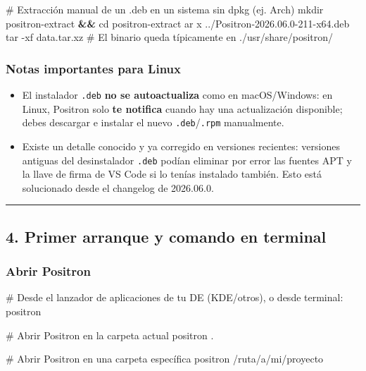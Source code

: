 \documentclass[
  doc,
  floatsintext,
  longtable,
  a4paper,
  nolmodern,
  notxfonts,
  notimes,
  12pt,
  colorlinks=true,linkcolor=blue,citecolor=blue,urlcolor=blue]{apa7}
\newenvironment{Shaded}{\begin{snugshade}}{\end{snugshade}}
\newcommand{\AttributeTok}[1]{\textcolor[rgb]{0.40,0.45,0.13}{#1}}
\newcommand{\BuiltInTok}[1]{\textcolor[rgb]{0.00,0.23,0.31}{#1}}
\newcommand{\CommentTok}[1]{\textcolor[rgb]{0.37,0.37,0.37}{#1}}
\newcommand{\ExtensionTok}[1]{\textcolor[rgb]{0.00,0.23,0.31}{#1}}
\newcommand{\FunctionTok}[1]{\textcolor[rgb]{0.28,0.35,0.67}{#1}}
\newcommand{\KeywordTok}[1]{\textcolor[rgb]{0.00,0.23,0.31}{\textbf{#1}}}
\newcommand{\NormalTok}[1]{\textcolor[rgb]{0.00,0.23,0.31}{#1}}
\providecommand{\tightlist}{%
  \setlength{\itemsep}{0pt}\setlength{\parskip}{0pt}}
\begin{document}
\begin{Shaded}
\begin{Highlighting}[]
\CommentTok{\# Extracción manual de un .deb en un sistema sin dpkg (ej. Arch)}
\FunctionTok{mkdir}\NormalTok{ positron{-}extract }\KeywordTok{\&\&} \BuiltInTok{cd}\NormalTok{ positron{-}extract}
\FunctionTok{ar}\NormalTok{ x ../Positron{-}2026.06.0{-}211{-}x64.deb}
\FunctionTok{tar} \AttributeTok{{-}xf}\NormalTok{ data.tar.xz}
\CommentTok{\# El binario queda típicamente en ./usr/share/positron/}
\end{Highlighting}
\end{Shaded}

\subsubsection{Notas importantes para
Linux}\label{notas-importantes-para-linux}

\begin{itemize}
\tightlist
\item
  El instalador \texttt{.deb} \textbf{no se autoactualiza} como en
  macOS/Windows: en Linux, Positron solo \textbf{te notifica} cuando hay
  una actualización disponible; debes descargar e instalar el nuevo
  \texttt{.deb}/\texttt{.rpm} manualmente.
\item
  Existe un detalle conocido y ya corregido en versiones recientes:
  versiones antiguas del desinstalador \texttt{.deb} podían eliminar por
  error las fuentes APT y la llave de firma de VS Code si lo tenías
  instalado también. Esto está solucionado desde el changelog de
  2026.06.0.
\end{itemize}

\begin{center}\rule{0.5\linewidth}{0.5pt}\end{center}

\subsection{4. Primer arranque y comando en
terminal}\label{primer-arranque-y-comando-en-terminal}

\subsubsection{Abrir Positron}\label{abrir-positron}

\begin{Shaded}
\begin{Highlighting}[]
\CommentTok{\# Desde el lanzador de aplicaciones de tu DE (KDE/otros), o desde terminal:}
\ExtensionTok{positron}

\CommentTok{\# Abrir Positron en la carpeta actual}
\ExtensionTok{positron}\NormalTok{ .}

\CommentTok{\# Abrir Positron en una carpeta específica}
\ExtensionTok{positron}\NormalTok{ /ruta/a/mi/proyecto}
\end{Highlighting}
\end{Shaded}
\end{document}
